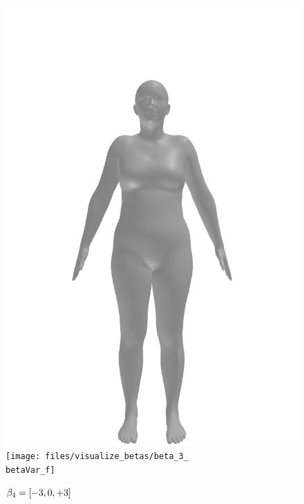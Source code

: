 \begin{figure}[ht!]
\begin{minipage}[b]{\textwidth}
        \includegraphics[width=\imgWidth]{files/visualize_betas/baseline_f}
        \texttt{[image: files/visualize\_betas/beta\_3\_\\betaVar\_f]}
        \caption[Effect of varying $\beta_4$ in SMPL]{$\beta_4 = [-3, 0, +3]$}
    \end{minipage}
\end{figure}

